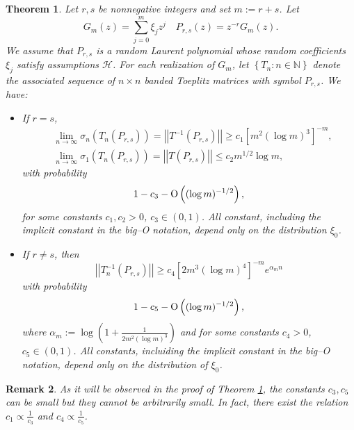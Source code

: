 \documentclass[12pt]{amsart}
\theoremstyle{plain}
\numberwithin{equation}{section}
\newtheorem{theorem}{Theorem}[section]
\newtheorem{remark}[theorem]{Remark}
\newcommand{\<}{\langle}
\renewcommand{\>}{\rangle}
\newcommand{\PP}[1]{\left(#1\right)}
\newcommand{\CC}[1]{\left[#1\right]}
\newcommand{\LL}[1]{\left\{#1\right\}}
\newcommand{\N}{\mathds{N}}
\newcommand{\norm}[1]{\left|\left|#1\right|\right|}
\begin{document}
\begin{theorem}\label{thm:main}
Let $r,s$ be nonnegative integers and set  $m:=r+s$. Let \[ G_{m}(z)=\sum_{j=0}^{m} \xi_j z^j \quad P_{r,s}(z)=z^{-r}G_{m}(z). \] We assume that $P_{r,s}$ is a random Laurent polynomial whose random coefficients $\xi_j$ satisfy assumptions $\mathcal{H}$. For each realization of $G_m$, let $\LL{T_n : n\in\N}$ denote the associated sequence of $n\times n$ banded Toeplitz matrices with symbol $P_{r,s}$. We have:
\begin{itemize}
\item If $r=s$, 
\begin{align*}
& \lim_{n\to\infty} \sigma_n(T_n(P_{r,s})) = \norm{T^{-1}(P_{r,s})} \geq c_1 \CC{ m^2 (\log m)^3}^{-m}, \\
& \lim_{n\to\infty} \sigma_1(T_n(P_{r,s})) = \norm{T(P_{r,s})} \leq c_2 m^{1/2}\log m,
\end{align*}
with probability  
\[
1 - c_3 - \textnormal{O}\PP{(\log m)^{-1/2}},
\]
for some constants $c_1,c_2>0$, $c_3\in(0,1)$. All constant, including the implicit constant in the big--\textnormal{O} notation, depend only on the distribution $\xi_0$.

\item If $r\neq s$, then 
\[
\norm{T_n^{-1} (P_{r,s})}\geq c_4 \CC{2m^{3}(\log m)^{4}}^{-m} e^{ \alpha_m n }
\]
with probability 
\[
1 - c_5  - \textnormal{O}\PP{(\log m)^{-1/2}},
\] 
where $\alpha_m:=\log\PP{1 + \frac{1}{2m^2(\log m)^3}}$ and for some constants $c_4>0$, $c_5\in(0,1)$. All constants, incluiding the implicit constant in the big--\textnormal{O} notation, depend only on the distribution of $\xi_0$.
\end{itemize}
\end{theorem}

\begin{remark} 
As it will be observed in the proof of Theorem \ref{thm:main}, the constants $c_3,c_5$ can be small but they cannot be arbitrarily small. In fact, there exist the relation $c_1 \propto \frac{1}{c_3}$  and $c_4 \propto \frac{1}{c_5}$.
\end{remark}
\end{document}
